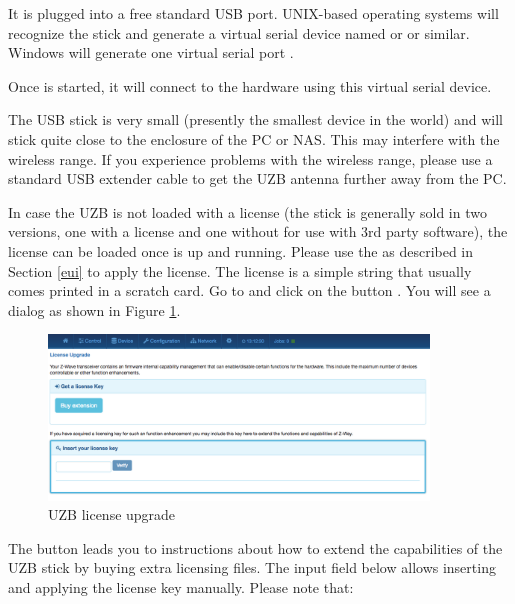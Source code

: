 It is plugged into a free standard USB port. UNIX-based operating systems will recognize 
the stick and generate a virtual serial device named
 or  or similar.
Windows will generate one virtual serial port .

Once \zway is started, it will connect to the \zwave hardware using this virtual serial device.

The USB stick is very small (presently the smallest \zwave device in the world) and will stick quite 
close to the enclosure of the PC or NAS. This may interfere with the wireless range. 
If you experience problems with the wireless range, please use a standard USB extender 
cable to get the UZB antenna further away from the PC.

In case the UZB is not loaded with a \zway license (the stick is generally sold in two 
versions, one with a license and one without for use with 3rd party software), the 
license can be loaded once \zway is 
up and running. Please use the \zweui as described in Section \ref{eui} to apply 
the license. The license is a simple string that usually comes printed in a scratch 
card. Go to  and click on the button 
. You will see a dialog as shown in Figure \ref{license}.


\begin{figure}
\begin{center}
\includegraphics[width=0.9\textwidth]{pngs/cap2/licensefile.png}
\caption{UZB license upgrade}
\label{license}
\end{center}
\end{figure}

The  button leads you to instructions about how to extend the 
capabilities of the UZB stick by buying extra licensing files. The input field below 
allows inserting and applying the license key manually. Please note that:

